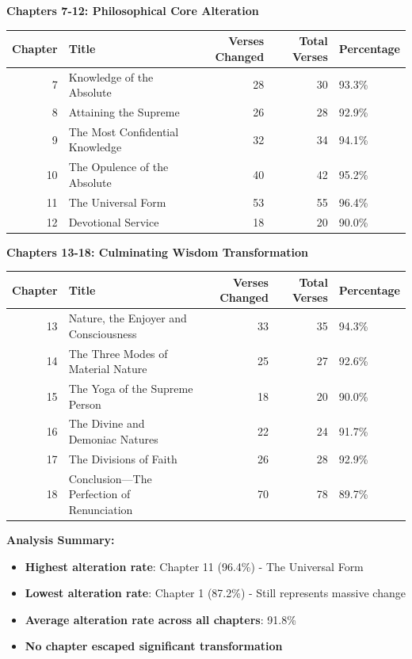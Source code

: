 \documentclass[11pt,twoside]{book}
\begin{document}
\textbf{\textbf{Chapters 7-12: Philosophical Core Alteration}}

\begin{center}
\begin{tabular}{rlrrl}
Chapter & Title & Verses Changed & Total Verses & Percentage\\
\hline
7 & Knowledge of the Absolute & 28 & 30 & 93.3\%\\
8 & Attaining the Supreme & 26 & 28 & 92.9\%\\
9 & The Most Confidential Knowledge & 32 & 34 & 94.1\%\\
10 & The Opulence of the Absolute & 40 & 42 & 95.2\%\\
11 & The Universal Form & 53 & 55 & 96.4\%\\
12 & Devotional Service & 18 & 20 & 90.0\%\\
\end{tabular}
\end{center}

\textbf{\textbf{Chapters 13-18: Culminating Wisdom Transformation}}

\begin{center}
\begin{tabular}{rlrrl}
Chapter & Title & Verses Changed & Total Verses & Percentage\\
\hline
13 & Nature, the Enjoyer and Consciousness & 33 & 35 & 94.3\%\\
14 & The Three Modes of Material Nature & 25 & 27 & 92.6\%\\
15 & The Yoga of the Supreme Person & 18 & 20 & 90.0\%\\
16 & The Divine and Demoniac Natures & 22 & 24 & 91.7\%\\
17 & The Divisions of Faith & 26 & 28 & 92.9\%\\
18 & Conclusion—The Perfection of Renunciation & 70 & 78 & 89.7\%\\
\end{tabular}
\end{center}

\textbf{\textbf{Analysis Summary:}}
\begin{itemize}
\item \textbf{\textbf{Highest alteration rate}}: Chapter 11 (96.4\%) - The Universal Form
\item \textbf{\textbf{Lowest alteration rate}}: Chapter 1 (87.2\%) - Still represents massive change
\item \textbf{\textbf{Average alteration rate across all chapters}}: 91.8\%
\item \textbf{\textbf{No chapter escaped significant transformation}}
\end{itemize}
\end{document}
